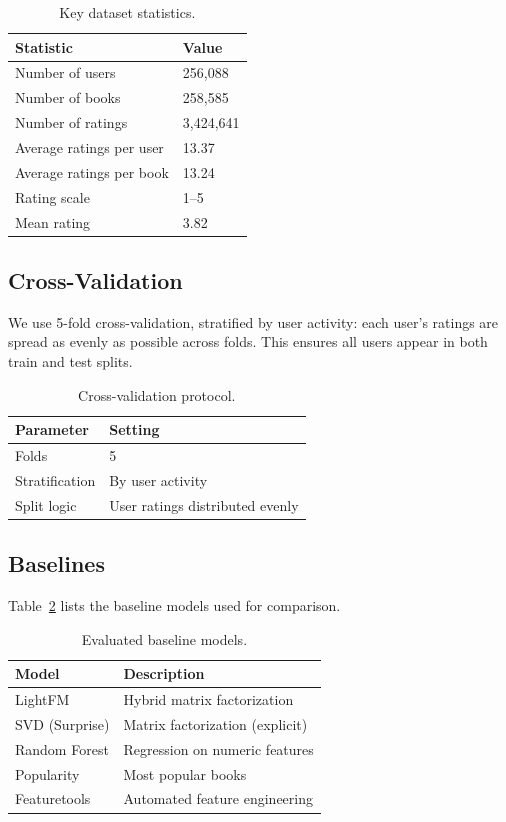 \begin{table}[h]
\centering
\caption{Key dataset statistics.}
\label{tab:dataset-stats}
\begin{tabular}{ll}
\toprule
Statistic & Value \\
\midrule
Number of users & 256,088 \\
Number of books & 258,585 \\
Number of ratings & 3,424,641 \\
Average ratings per user & 13.37 \\
Average ratings per book & 13.24 \\
Rating scale & 1--5 \\
Mean rating & 3.82 \\
\bottomrule
\end{tabular}
\end{table}

\subsection{Cross-Validation}

We use 5-fold cross-validation, stratified by user activity: each user's ratings are spread as evenly as possible across folds. This ensures all users appear in both train and test splits.

\begin{table}[h]
\centering
\caption{Cross-validation protocol.}
\begin{tabular}{ll}
\toprule
Parameter & Setting \\
\midrule
Folds & 5 \\
Stratification & By user activity \\
Split logic & User ratings distributed evenly \\
\bottomrule
\end{tabular}
\end{table}

\subsection{Baselines}

Table~\ref{tab:baselines} lists the baseline models used for comparison.

\begin{table}[h]
\centering
\caption{Evaluated baseline models.}
\label{tab:baselines}
\begin{tabular}{ll}
\toprule
Model & Description \\
\midrule
LightFM & Hybrid matrix factorization \\
SVD (Surprise) & Matrix factorization (explicit) \\
Random Forest & Regression on numeric features \\
Popularity & Most popular books \\
Featuretools & Automated feature engineering \\
\bottomrule
\end{tabular}
\end{table}

